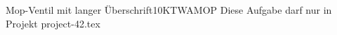 \begin{examaufgabe}{Mop-Ventil mit langer Überschrift}{10}{KT}{WA}{MOP}
Diese Aufgabe darf nur in Projekt project-42.tex

\end{examaufgabe}